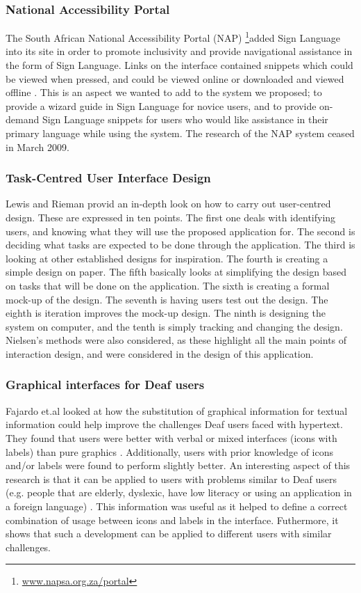 \documentclass{sig-alternate-05-2015}
\begin{document}
\subsubsection{National Accessibility Portal}
The South African National Accessibility Portal (NAP) \footnote{\href{http://www.napsa.org.za/portal}{www.napsa.org.za/portal}}added Sign Language into its site in order to promote inclusivity and provide navigational assistance in the form of Sign Language. Links on the interface contained snippets which could be viewed when pressed, and could be viewed online or downloaded and viewed offline \cite{coetzee2007national}. This is an aspect we wanted to add to the system we proposed; to provide a wizard guide in Sign Language for novice users, and to provide on-demand Sign Language snippets for
users who would like assistance in their primary language while using the system. The research of the NAP system ceased in March 2009.

\subsubsection{Task-Centred User Interface Design}
Lewis and Rieman \cite{lewis1993task} provid an in-depth look on how to carry out user-centred design. These are expressed in ten points. The first one deals with identifying users, and knowing what they will use the proposed application for. The second is deciding what tasks are expected to be done through the application. The third is looking at other established designs for inspiration. The fourth is creating a simple design on paper. The fifth basically looks at simplifying the design based on tasks that will be done on the application. The sixth is creating a formal mock-up of the design. The seventh is having users test out the design. The eighth is iteration improves the mock-up design. The ninth is designing the system on computer, and the tenth is simply tracking and changing the design. Nielsen's \cite{nielsen1994usability} methods were also considered, as these highlight all the main points of interaction design, and were considered in the design of this application.

\subsubsection{Graphical interfaces for Deaf users}
Fajardo et.al \cite{fajardo2006improving} looked at how the substitution of graphical information for textual information could help improve the challenges Deaf users faced with hypertext. They found that users were better with verbal or mixed interfaces (icons with labels) than pure graphics \cite{fajardo2006improving}. Additionally, users with prior knowledge of icons and/or labels were found to perform slightly better. An interesting aspect of this research is that it can be applied to users with problems similar to Deaf users (e.g. people that are elderly, dyslexic, have low literacy or using an application in a foreign language) \cite{fajardo2006improving}. This information was useful as it helped to define a correct combination of usage between icons and labels in the interface. Futhermore, it shows that such a development can be applied to different users with similar challenges.
\end{document}
